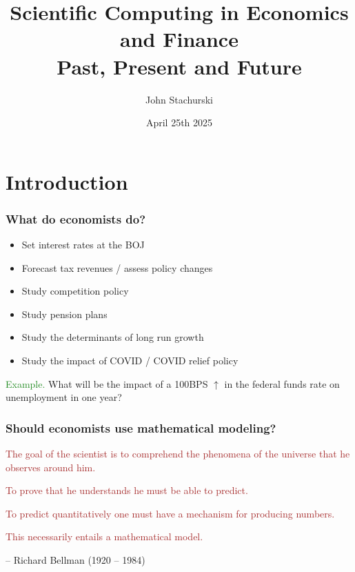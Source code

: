 \documentclass[
    xcolor={svgnames,dvipsnames},
    hyperref={colorlinks, citecolor=DeepPink4, linkcolor=DarkRed, urlcolor=DarkBlue}
    ]{beamer}  %
\title{Scientific Computing in Economics and Finance\\
    Past, Present and Future}
\author{John Stachurski}
\institute{Tokyo College and Australian National University}
\date{April 25th 2025}
\newcommand{\Eg}{\textcolor{ForestGreen}{Example. }}
\newcommand{\brown}[1]{\textcolor{Brown}{\sf #1}}
\newcommand{\1}{\mathbbm 1}
\begin{document}
\begin{frame}
  \titlepage
\end{frame}





\section{Introduction}



\begin{frame}
    \frametitle{What do economists do?}

    \begin{itemize}
        \item Set interest rates at the BOJ
            \vspace{0.3em}
        \item Forecast tax revenues / assess policy changes
            \vspace{0.3em}
        \item Study competition policy 
            \vspace{0.3em}
        \item Study pension plans
            \vspace{0.3em}
        \item Study the determinants of long run growth
            \vspace{0.3em}
        \item Study the impact of COVID / COVID relief policy
    \end{itemize}

            \vspace{0.3em}
            \vspace{0.3em}

    \Eg What will be the impact of a 100BPS $\uparrow$ in the federal funds
    rate on unemployment in one year?

\end{frame}


\begin{frame}
    \frametitle{Should economists use mathematical modeling?}

    \brown{The goal of the scientist is to comprehend the phenomena of the
    universe that he observes around him.}

            \vspace{0.3em}
    \brown{To prove that he understands he must be able to predict.}

            \vspace{0.3em}
    \brown{To predict quantitatively one must have a mechanism for producing
    numbers.}

            \vspace{0.3em}
    \brown{This necessarily entails a mathematical model.}

            \vspace{0.3em}
            \vspace{0.3em}
            \vspace{0.3em}
     -- Richard Bellman (1920 -- 1984)

\end{frame}
\end{document}
